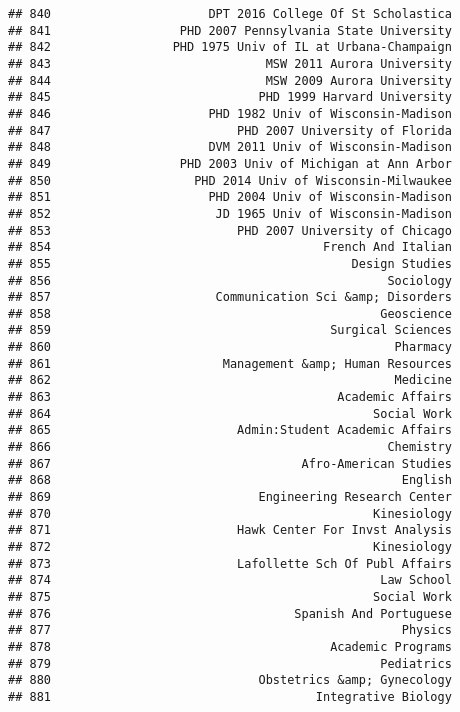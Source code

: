 \documentclass[
]{article}
\begin{document}
\begin{verbatim}
## 840                      DPT 2016 College Of St Scholastica
## 841                  PHD 2007 Pennsylvania State University
## 842                 PHD 1975 Univ of IL at Urbana-Champaign
## 843                              MSW 2011 Aurora University
## 844                              MSW 2009 Aurora University
## 845                             PHD 1999 Harvard University
## 846                      PHD 1982 Univ of Wisconsin-Madison
## 847                          PHD 2007 University of Florida
## 848                      DVM 2011 Univ of Wisconsin-Madison
## 849                  PHD 2003 Univ of Michigan at Ann Arbor
## 850                    PHD 2014 Univ of Wisconsin-Milwaukee
## 851                      PHD 2004 Univ of Wisconsin-Madison
## 852                       JD 1965 Univ of Wisconsin-Madison
## 853                          PHD 2007 University of Chicago
## 854                                      French And Italian
## 855                                          Design Studies
## 856                                               Sociology
## 857                       Communication Sci &amp; Disorders
## 858                                              Geoscience
## 859                                       Surgical Sciences
## 860                                                Pharmacy
## 861                        Management &amp; Human Resources
## 862                                                Medicine
## 863                                        Academic Affairs
## 864                                             Social Work
## 865                          Admin:Student Academic Affairs
## 866                                               Chemistry
## 867                                   Afro-American Studies
## 868                                                 English
## 869                             Engineering Research Center
## 870                                             Kinesiology
## 871                          Hawk Center For Invst Analysis
## 872                                             Kinesiology
## 873                          Lafollette Sch Of Publ Affairs
## 874                                              Law School
## 875                                             Social Work
## 876                                  Spanish And Portuguese
## 877                                                 Physics
## 878                                       Academic Programs
## 879                                              Pediatrics
## 880                             Obstetrics &amp; Gynecology
## 881                                     Integrative Biology

\end{verbatim}
\end{document}
